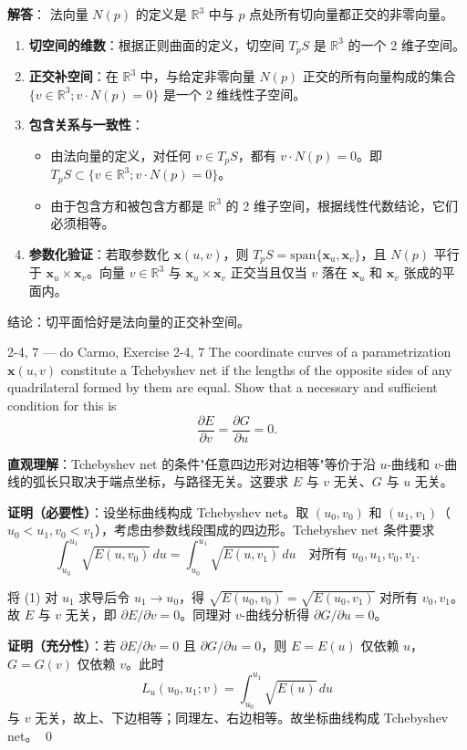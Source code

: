 \begin{solution}
\textbf{解答}：
法向量 $N(p)$ 的定义是 $\mathbb{R}^3$ 中与 $p$ 点处所有切向量都正交的非零向量。

\begin{enumerate}
    \item \textbf{切空间的维数}：根据正则曲面的定义，切空间 $T_pS$ 是 $\mathbb{R}^3$ 的一个 2 维子空间。
    \item \textbf{正交补空间}：在 $\mathbb{R}^3$ 中，与给定非零向量 $N(p)$ 正交的所有向量构成的集合 $\{v \in \mathbb{R}^3; v \cdot N(p) = 0\}$ 是一个 2 维线性子空间。
    \item \textbf{包含关系与一致性}：
    \begin{itemize}
        \item 由法向量的定义，对任何 $v \in T_pS$，都有 $v \cdot N(p) = 0$。即 $T_pS \subset \{v \in \mathbb{R}^3; v \cdot N(p) = 0\}$。
        \item 由于包含方和被包含方都是 $\mathbb{R}^3$ 的 2 维子空间，根据线性代数结论，它们必须相等。
    \end{itemize}
    \item \textbf{参数化验证}：若取参数化 $\mathbf{x}(u, v)$，则 $T_pS = \text{span}\{\mathbf{x}_u, \mathbf{x}_v\}$，且 $N(p)$ 平行于 $\mathbf{x}_u \times \mathbf{x}_v$。向量 $v \in \mathbb{R}^3$ 与 $\mathbf{x}_u \times \mathbf{x}_v$ 正交当且仅当 $v$ 落在 $\mathbf{x}_u$ 和 $\mathbf{x}_v$ 张成的平面内。
\end{enumerate}
结论：切平面恰好是法向量的正交补空间。
\end{solution}

\begin{exercise}{2-4, 7 — do Carmo, Exercise 2-4, 7}
The coordinate curves of a parametrization $\mathbf{x}(u, v)$ constitute a Tchebyshev net if the lengths of the opposite sides of any quadrilateral formed by them are equal. Show that a necessary and sufficient condition for this is
\[
\frac{\partial E}{\partial v} = \frac{\partial G}{\partial u} = 0.
\]
\end{exercise}

\begin{solution}
\textbf{直观理解}：Tchebyshev net 的条件"任意四边形对边相等"等价于沿 $u$-曲线和 $v$-曲线的弧长只取决于端点坐标，与路径无关。这要求 $E$ 与 $v$ 无关、$G$ 与 $u$ 无关。

\textbf{证明（必要性）}：设坐标曲线构成 Tchebyshev net。取 $(u_0,v_0)$ 和 $(u_1,v_1)$（$u_0 < u_1, v_0 < v_1$），考虑由参数线段围成的四边形。Tchebyshev net 条件要求
\[
\int_{u_0}^{u_1} \sqrt{E(u,v_0)}\, du = \int_{u_0}^{u_1} \sqrt{E(u,v_1)}\, du
\quad \text{对所有 } u_0,u_1,v_0,v_1.
\tag{1}
\]

将 (1) 对 $u_1$ 求导后令 $u_1 \to u_0$，得 $\sqrt{E(u_0,v_0)} = \sqrt{E(u_0,v_1)}$ 对所有 $v_0,v_1$。故 $E$ 与 $v$ 无关，即 $\partial E/\partial v = 0$。同理对 $v$-曲线分析得 $\partial G/\partial u = 0$。

\textbf{证明（充分性）}：若 $\partial E/\partial v = 0$ 且 $\partial G/\partial u = 0$，则 $E = E(u)$ 仅依赖 $u$，$G = G(v)$ 仅依赖 $v$。此时
\[
L_u(u_0,u_1;v) = \int_{u_0}^{u_1} \sqrt{E(u)}\, du
\]
与 $v$ 无关，故上、下边相等；同理左、右边相等。故坐标曲线构成 Tchebyshev net。
\qed
\end{solution}

